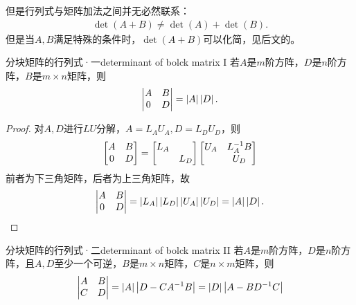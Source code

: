 但是行列式与矩阵加法之间并无必然联系：
\begin{align}
	\det(A+B)\neq\det(A)+\det(B).
\end{align}
但是当$A,B$满足特殊的条件时，$\det(A+B)$可以化简，见后文的。
\begin{theorem}{分块矩阵的行列式·一}{determinant of bolck matrix I}
	若$A$是$m$阶方阵，$D$是$n$阶方阵，$B$是$m\times n$矩阵，则
	\begin{align}
		\begin{vmatrix}
			A&B\\0&D
		\end{vmatrix}=\left\lvert A\right\rvert\left\lvert D\right\rvert.
	\end{align}
\end{theorem}
\begin{proof}
	对$A,D$进行$LU$分解，$A=L_AU_A,D=L_DU_D$，则
	\[
		\begin{bmatrix}
			A&B\\0&D
		\end{bmatrix}=
		\begin{bmatrix}
			L_A\\ &L_D
		\end{bmatrix}
		\begin{bmatrix}
			U_A&L_A^{-1} B\\ &U_D
		\end{bmatrix}
	\]
	前者为下三角矩阵，后者为上三角矩阵，故
	\[
		\begin{vmatrix}
			A&B\\0&D
		\end{vmatrix}=\left\lvert L_A\right\rvert\left\lvert L_D\right\rvert\left\lvert U_A\right\rvert\left\lvert U_D\right\rvert=\left\lvert A\right\rvert\left\lvert D\right\rvert.
	\]
\end{proof}
\begin{theorem}{分块矩阵的行列式·二}{determinant of bolck matrix II}
	若$A$是$m$阶方阵，$D$是$n$阶方阵，且$A,D$至少一个可逆，$B$是$m\times n$矩阵，$C$是$n\times m$矩阵，则
	\begin{align}
		\begin{vmatrix}
			A&B\\C&D
		\end{vmatrix}=
		\left\lvert A\right\rvert\left\lvert D-CA^{-1} B\right\rvert=
		\left\lvert D\right\rvert\left\lvert A-BD^{-1} C\right\rvert
	\end{align}
\end{theorem}

